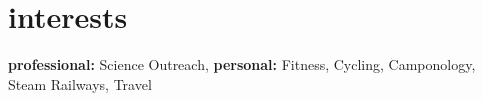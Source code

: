 \documentclass[]{cv-style}          %
\begin{document}

\section{interests}
  \vspace{-0.2cm}

\textbf{professional:} Science Outreach, 
\textbf{personal:} Fitness, Cycling, Camponology, Steam Railways, Travel

\end{document}
